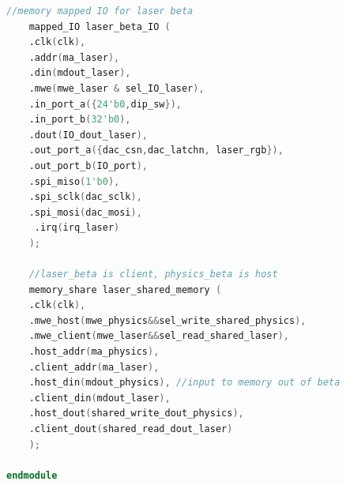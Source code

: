 \documentclass{article}
\begin{document}
\begin{lstlisting}[language=Verilog]
	//memory mapped IO for laser beta
	mapped_IO laser_beta_IO (
    .clk(clk), 
    .addr(ma_laser), 
    .din(mdout_laser), 
    .mwe(mwe_laser & sel_IO_laser), 
    .in_port_a({24'b0,dip_sw}), 
    .in_port_b(32'b0), 
    .dout(IO_dout_laser), 
    .out_port_a({dac_csn,dac_latchn, laser_rgb}), 
    .out_port_b(IO_port), 
    .spi_miso(1'b0),  
    .spi_sclk(dac_sclk), 
    .spi_mosi(dac_mosi),
	 .irq(irq_laser)
    );

	//laser_beta is client, physics_beta is host
	memory_share laser_shared_memory (
    .clk(clk), 
    .mwe_host(mwe_physics&&sel_write_shared_physics), 
    .mwe_client(mwe_laser&&sel_read_shared_laser), 
    .host_addr(ma_physics), 
    .client_addr(ma_laser), 
    .host_din(mdout_physics), //input to memory out of beta
    .client_din(mdout_laser), 
    .host_dout(shared_write_dout_physics), 
    .client_dout(shared_read_dout_laser)
    );
	 
endmodule
\end{lstlisting}
\end{document}
